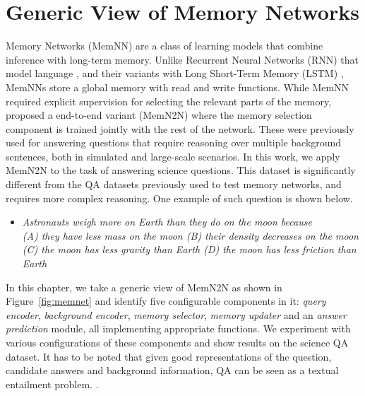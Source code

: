 \section{Generic View of Memory Networks}
Memory Networks (MemNN) \citep{weston2014memory} are a class of learning models
that combine inference with long-term memory. Unlike Recurrent Neural Networks
(RNN) that model language \citep{mikolov2010recurrent}, and their variants with
Long Short-Term Memory (LSTM) \citep{hochreiter1997long}, MemNNs store a global
memory with read and write functions. While MemNN required explicit supervision
for selecting the relevant parts of the memory, \citep{sukhbaatar2015end}
proposed a end-to-end variant (MemN2N) where the memory selection component is
trained jointly with the rest of the network. These were previously used for
answering questions that require reasoning over multiple background sentences,
both in simulated \citep{bordes2010towards} and large-scale
\citep{fader2013paraphrase} scenarios. In this work, we apply MemN2N to the task
of answering science questions. This dataset is significantly different from the
QA datasets previously used to test memory networks, and requires more complex
reasoning. One example of such question is shown below.
\begin{itemize}
\item \textit{Astronauts weigh more on Earth than they do on the moon because \\
(A) they have less mass on the moon (B) their density decreases on the moon (C)
the moon has less gravity than Earth (D) the moon has less friction than Earth}
\end{itemize}
In this chapter, we take a generic view of MemN2N as shown in
Figure~\ref{fig:memnet} and identify five configurable components in it:
\textit{query encoder}, \textit{background encoder}, \textit{memory selector},
\textit{memory updater} and an \textit{answer prediction} module, all
implementing appropriate functions. We experiment with various configurations of
these components and show results on the science QA dataset. It has to be noted
that given good representations of the question, candidate answers and
background information, QA can be seen as a textual entailment problem.
\citep{bowman2015large}.

